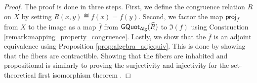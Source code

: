 \begin{proof}
The proof is done in three steps.
First, we define the congruence relation $R$ on $X$ by setting $R(x, y) \eqdef f(x) = f(y)$.
Second, we factor the map $\mathsf{proj}_{f}$ from $X$ to the image as a map $\overline{f}$ from $\mathsf{GQuot}_{\mathsf{Alg}}(\widehat{R})$ to $\Im(f)$ using Construction \ref{remark:mapping_property_congruence}.
Lastly, we show that the $\overline{f}$ is an adjoint equivalence using Proposition \ref{prop:algebra_adjequiv}.
This is done by showing that the fibers are contractible.
Showing that the fibers are inhabited and propositional is similarly to proving the surjectivity and injectivity for the set-theoretical first isomorphism theorem \cite{lynge2019}.
\end{proof}
